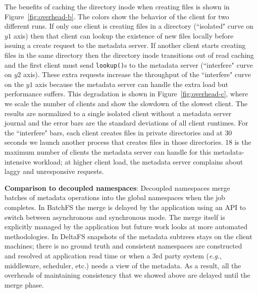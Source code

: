 The benefits of caching the directory inode when creating files is shown in
Figure~\ref{fig:overhead-b}. The colors show the behavior of the client for two
different runs.  If only one client is creating files in a directory
(``isolated" curve on \(y1\) axis) then that client can lookup the existence of
new files locally before issuing a create request to the metadata server. If
another client starts creating files in the same directory then the directory
inode transitions out of read caching and the first client must send
\texttt{lookup()}s to the metadata server (``interfere" curve on \(y2\) axis).
These extra requests increase the throughput of the ``interfere" curve on the
\(y1\) axis because the metadata server can handle the extra load but
performance suffers.  This degradation is shown in Figure~\ref{fig:overhead-c},
where we scale the number of clients and show the slowdown of the slowest
client.  The results are normalized to a single isolated client without a
metadata server journal and the error bars are the standard deviations of all
client runtimes.  For the ``interfere" bars, each client creates files in
private directories and at 30 seconds we launch another process that creates
files in those directories. 18 is the maximum number of clients the metadata
server can handle for this metadata-intensive workload; at higher client load,
the metadata server complains about laggy and unresponsive requests.


\textbf{Comparison to decoupled namespaces}: Decoupled namespaces
merge batches of metadata operations into the global namespaces when the job
completes.  In BatchFS the merge is delayed by the application using an API to
switch between asynchronous and synchronous mode. The merge itself is explicitly
managed by the application but future work looks at more automated
methodologies. In DeltaFS snapshots of the metadata subtrees stays on the client
machines; there is no ground truth and consistent namespaces are constructed
and resolved at application read time or when a 3rd party system ({\it e.g.},
middleware, scheduler, etc.) needs a view of the metadata. As a result, all the
overheads of maintaining consistency that we showed above are delayed until the
merge phase.
